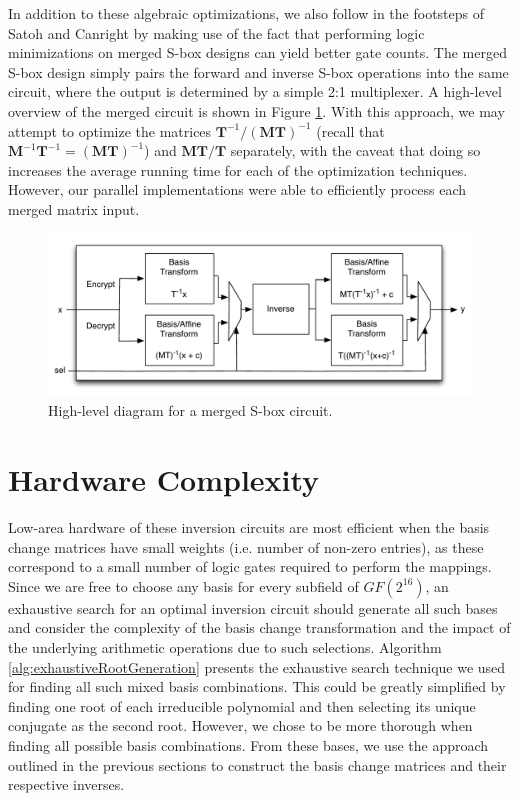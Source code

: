 In addition to these algebraic optimizations, we also follow in the footsteps of Satoh \cite{Satoh01-1} and Canright \cite{Canright05-1} by making use of the fact that performing logic minimizations on merged S-box designs can yield better gate counts. The merged S-box design simply pairs the forward and inverse S-box operations into the same circuit, where the output is determined by a simple 2:1 multiplexer. A high-level overview of the merged circuit is shown in Figure \ref{fig:merged}. With this approach, we may attempt to optimize the matrices $\mathbf{T}^{-1} / (\mathbf{MT})^{-1}$ (recall that $\mathbf{M}^{-1}\mathbf{T}^{-1} = (\mathbf{MT})^{-1}$) and $\mathbf{MT} / \mathbf{T}$ separately, with the caveat that doing so increases the average running time for each of the optimization techniques. However, our parallel implementations were able to efficiently process each merged matrix input.

\begin{figure}
\centering
\includegraphics[scale=0.75]{./chapter_inverseImpl/merged_sboxes.pdf}
\caption{High-level diagram for a merged S-box circuit.}
\label{fig:merged}
\end{figure}

\section{Hardware Complexity}
Low-area hardware of these inversion circuits are most efficient when the basis change matrices have small weights (i.e. number of non-zero entries), as these correspond to a small number of logic gates required to perform the mappings. Since we are free to choose any basis for every subfield of $GF(2^{16})$, an exhaustive search for an optimal inversion circuit should generate all such bases and consider the complexity of the basis change transformation and the impact of the underlying arithmetic operations due to such selections. Algorithm \ref{alg:exhaustiveRootGeneration} presents the exhaustive search technique we used for finding all such mixed basis combinations. This could be greatly simplified by finding one root of each irreducible polynomial and then selecting its unique conjugate as the second root. However, we chose to be more thorough when finding all possible basis combinations. From these bases, we use the approach outlined in the previous sections to construct the basis change matrices and their respective inverses.


